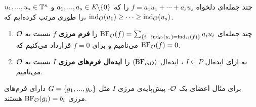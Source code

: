 \begin{definition}
چند جمله‌ای دلخواه 
$f = a_{1}u_{1} + \cdots + a_{s}u_{s}$
را که 
$a_{1},...,a_{s}\in\textit{K}\backslash\{0\}$
و
$u_{1},...,u_{s}\in{\mathbb{T}}^{n}$
را طوری مرتب کرده‌ایم که، 
$\operatorname{\mathrm{ind}}_{{\mathcal O}}(u_{1})\geq \cdots \geq \operatorname{\mathrm{ind}}_{{\mathcal O}}(u_{s})$.
\begin{enumerate}
	\item
چند جمله‌ای 
$\operatorname{\mathrm{BF}}_{{\mathcal O}}(f) = \sum_{\{i| \ \operatorname{\mathrm{ind}}_{{\mathcal O}}(u_{i}) = \operatorname{\mathrm{ind}}_{{\mathcal O}}(f)\}}a_{i}u_{i}$
را 
\textbf{فرم مرزی}
$f$
نسبت به 
${\mathcal O}$
می‌نامیم و برای 
$f = 0$
قرارداد می‌کنیم که 
$\operatorname{\mathrm{BF}}_{{\mathcal O}}(f) = 0$.

\item
به ازای ایده‌ال 
$I\subseteq P$
، ایده‌ال 
$\langle\operatorname{\mathrm{BF}}_{mO}\rangle$
را 
\textbf{ایده‌ال فرم‌های مرزی}
$I$
نسبت به 
${\mathcal O}$
می‌نامیم.
\end{enumerate}
\end{definition}
برای مثال اعضای یک 
${\mathcal O}$-
پیش‌پایه‌ی مرزی 
$I$
مثل 
$G = \{g_{1},...,g_{\nu}\}$
دارای فرم‌های مرزی 
$\operatorname{\mathrm{BF}}_{{\mathcal O}}(g_{i}) = b_{i}$
هستند. 


